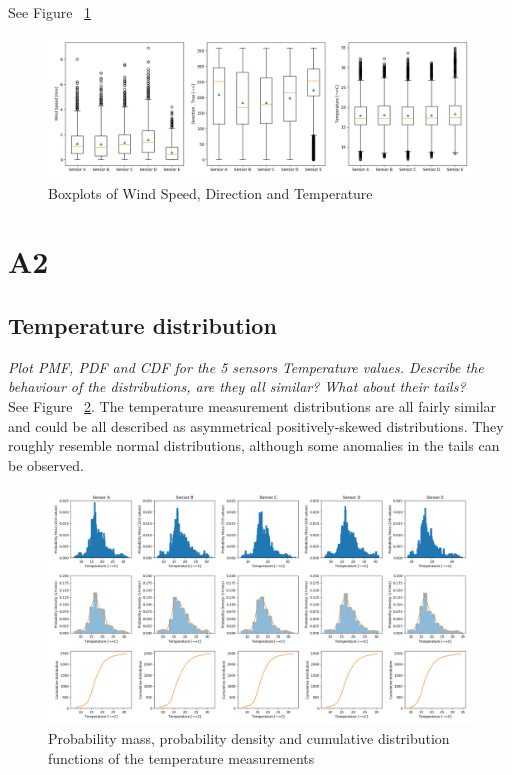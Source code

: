 \documentclass{article}
\begin{document}
See Figure ~\ref{fig:1-4}

\begin{figure}[!htb]
\centering
\includegraphics[width=\textwidth]{1-4-box.png}
\caption{Boxplots of Wind Speed, Direction and Temperature}
\label{fig:1-4}
\end{figure}


\newpage

\section{A2}

\subsection{Temperature distribution}
\textit{
Plot PMF, PDF and CDF for the 5 sensors Temperature values. Describe the behaviour of the distributions, are they all similar?
What about their tails?
}\\

See Figure ~\ref{fig:2-1}. The temperature measurement distributions are all fairly similar and could be all described as asymmetrical positively-skewed distributions. They roughly resemble normal distributions, although some anomalies in the tails can be observed.

\begin{figure}[!htb]
\centering
\includegraphics[width=\textwidth]{2-1-14_bins.png}
\caption{Probability mass, probability density and cumulative distribution functions of the temperature measurements}
\label{fig:2-1}
\end{figure}
\end{document}
